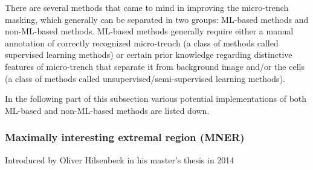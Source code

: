 \documentclass[pdftex,12pt,a4paper]{report}
\begin{document}
There are several methods that came to mind in improving the micro-trench masking, which generally can be separated in two groups: ML-based methods and non-ML-based methods. ML-based methods generally require either a manual annotation of correctly recognized micro-trench (a class of methods called supervised learning methods) or certain prior knowledge regarding distinctive features of micro-trench that separate it from background image and/or the cells (a class of methods called unsupervised/semi-supervised learning methods).

In the following part of this subsection various potential implementations of both ML-based and non-ML-based methods are listed down.

\subsubsection*{Maximally interesting extremal region (MNER)}

Introduced by Oliver Hilsenbeck in his master's thesis in 2014 \cite{hilsenbeck2014maximally} %







\end{document}
